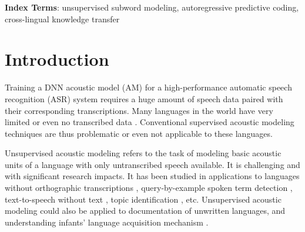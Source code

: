 \documentclass[a4paper]{article}
\begin{document}
\begin{abstract}

\end{abstract}
\noindent\textbf{Index Terms}: unsupervised subword modeling, autoregressive predictive coding, cross-lingual knowledge transfer

\section{Introduction}

Training a DNN acoustic model (AM) for a high-performance automatic speech recognition (ASR) system requires a huge amount of speech data paired with their corresponding transcriptions. 
Many languages in the world have very limited or even no transcribed data \cite{dunbar2017zero}. 
Conventional supervised acoustic modeling techniques are thus problematic or even not applicable to these languages.

Unsupervised acoustic modeling refers to the task of modeling basic acoustic units of a language with only untranscribed speech available. It is  challenging and  with significant research impacts. It has been studied in applications to languages without orthographic transcriptions \cite{I3EWang}, query-by-example spoken term detection \cite{Chen+2016}, text-to-speech without text \cite{Dunbar2019}, topic identification \cite{SiuGishChanEtAl2014}, etc. Unsupervised acoustic modeling could also be applied to documentation of unwritten languages, and understanding infants' language acquisition mechanism \cite{versteegh2015zero}. 
\end{document}
